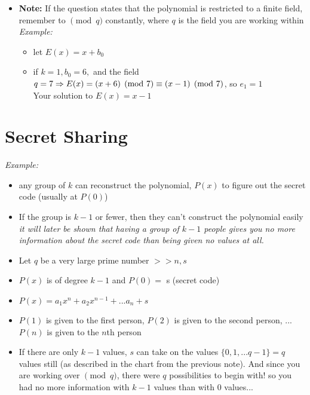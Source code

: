 \documentclass[a4paper]{article}
\begin{document}
\begin{itemize}
\begin{itemize}
\begin{itemize}
            \item \textbf{Note:} If the question states that the polynomial is restricted to a finite field, remember to $\pmod q$ constantly, where $q$ is the field you are working within\\
            \textit{Example:}
            \begin{itemize}
                \item let $E(x) = x + b_0$
                \item if $k=1, b_0= 6,$ and the field $q = 7\\ \Rightarrow E(x) = (x + 6) \pmod7 \equiv (x - 1)\pmod7$, so $e_1 = 1$\\
                Your solution to $E(x) = x - 1$
            \end{itemize}
        \end{itemize}
    \end{itemize}
\end{itemize}


\section{Secret Sharing}
\textit{Example:}
\begin{itemize}
        \item any group of $k$ can reconstruct the polynomial, $P(x)$ to figure out the secret code (usually at $P(0)$)
        \item If the group is $k-1$ or fewer, then they can't construct the polynomial easily \textit{it will later be shown that having a group of $k-1$ people gives you no more information about the secret code than being given no values at all.}
        \item Let $q$ be a very large prime number $>> n,s$
        \item $P(x)$ is of degree $k-1$ and $P(0) = $ s (secret code)
        \item $P(x) = a_1x^n + a_2x^{n-1}+...a_n + s$
        \item $P(1)$ is given to the first person, $P(2)$ is given to the second person, ... $P(n)$ is given to the $n$th person 
        \item If there are only $k-1$ values, $s$ can take on the values $\{0,1,... q-1\} = q$ values still (as described in the chart from the previous note). And since you are working over $\pmod q$, there were $q$ possibilities to begin with! so you had no more information with $k-1$ values than with $0$ values...
\end{itemize}
\end{document}
